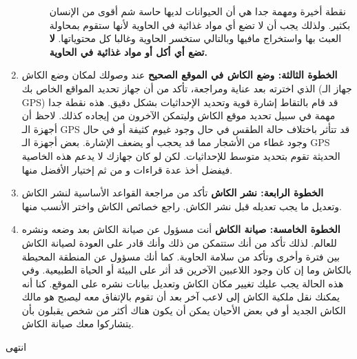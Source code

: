 \documentclass[12pt,a4paper,onecolumn,notitlepage]{book}
\begin{document}
\begin{enumerate}
\begin{description}
نقطة أخيرة ومهمة جدا هي أن الحيوانات لديها حاسة شم أقوى من الإنسان بكثير. ولذلك يجب أن لا تضع أي مواد غذائية في الحاوية لأنها ستقوم بمحاولة العبث بها واستخراج مافيها وبالتالي ستخسر الحاوية وغالبا كل محتوياتها. \textbf{لا تضع أي أكل أو مواد غذائية في الحاوية.}
\end{description}
\item\textbf{الخطوة الثالثة: وضع الكاش في الموقع الصحيح}
عند وصولك لمكان وضع الكاش الذي اخترته بعد عناية ومراجعة، تأكد من أن جهاز تحديد المواقع الخاص بك (جهاز الـ \textenglish{GPS}) قد قام بالتقاط إشارة قوية وتحديد الإحداثيات بشكل دقيق. هذه نقطة جدا مهمة في سبيل تحديد موقع الكاش وليتمكن الآخرون من إيجاده كذلك. لاحظ أن أجهزة الـ \textenglish{GPS} قد تتأثر باختلاف حالة الطقس في حال وجود غيوم كثيفة أو في حال وجود غطاء من الأشجار مما قد يحجب أو يضعف الإشارة. بعض أجهزة الـ \textenglish{GPS} الحديثة تقوم بتحديد متوسط للإحداثيات. لكن لو كان جهازك لا يدعم هذه الخاصية فيفضل أخذ عدة قراءات و من ثم إختيار الأفضل منها.
\item\textbf{الخطوة الرابعة: نشر الكاش}
تأكد من مراجعة القواعد الأساسية لنشر الكاش وتعديل ما يجب تعديله قبل نشر الكاش.
راجع خصائص الكاش واختر الأنسب منها.
\item\textbf{الخطوة الخامسة: صيانة الكاش}
أنت مسؤول عن صيانة الكاش بعد وضعه ونشره للعالم. لذلك تأكد من أنك ستتمكن من ذلك وأنك قادر على العودة لصيانة الكاش بين فترة وأخرى وتأكد من سلامة الحاوية. كما أنك مسؤول عن المنطقة المحيطة بالكاش وما إن كان وجود اللاعبين الآخرين قد أثر على البيئة أو الحياة الطبيعية. وفي هذه الحالة يجب عليك تغيير مكان الكاش وتعديل بيانات نشره على الموقع.
كنا أنه يمكنك نقل ملكية الكاش إلى لاعب آخر بعد أن تقوم بالإتفاق معه ليصبح هو مالك الكاش الجديد أو في بعض الأحيان يمكن أن يكون هناك أكثر من شخص يقبلون بأن يتشاركوا معك صيانة الكاش.
\end{enumerate}

\begin{center}
\vfill
\textcolor{slategray2Dark}{{\DiwanThuluth انتهى}}
\end{center}
\end{document}

